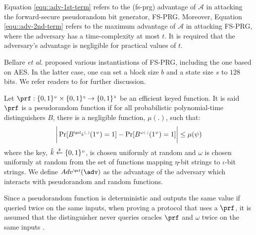 Equation \ref{equ::adv-1st-term}  refers to the (fs-prg) advantage of $\mathcal{A}$ in attacking the forward-secure pseudorandom bit generator, FS-PRG. Moreover, Equation \ref{equ::adv-2nd-term} refers to the maximum advantage of $\mathcal{A}$ in attacking FS-PRG, where the adversary has a time-complexity at most $t$. It is required that the adversary's advantage is negligible for practical values of $t$. 




Bellare \textit{et al.} \cite{BellareY03} proposed various instantiations of FS-PRG, including the one based on AES. In the latter case, one can set a block size $b$ and a state size $s$ to $128$ bits. We refer readers to \cite{BellareY03} for further discussion. 


\begin{definition} Let $\prf:\{0,1\}^{\sss\psi}\times \{0,1\}^{\sss \eta}\rightarrow \{0,1\}^{\sss  \lambda}$ be an efficient  keyed function. It is said $\prf$ is a pseudorandom function if for all probabilistic polynomial-time distinguishers $B$, there is a negligible function, $\mu(.)$, such that:
%
 \vspace{-1mm}
\begin{equation*}
\bigg | \Pr[B^{\sss \prf_{\hat{k}}(.)}(1^{\sss \psi})=1]- \Pr[B^{\sss \omega(.)}(1^{\sss \psi})=1] \bigg |\leq\mu(\psi)
\end{equation*}
%
where  the key, $\hat{k}\stackrel{\scriptscriptstyle\$}\leftarrow\{0,1\}^{\scriptscriptstyle\psi}$, is chosen uniformly at random and $\omega$ is chosen uniformly at random from the set of functions mapping $\eta$-bit strings to $\iota$-bit strings. We define $Adv^{\sss\prf}(\adv)$ as the advantage of the adversary which interacts with pseudorandom and random functions. 

\end{definition}

Since a pseudorandom function is deterministic and outputs the same value if queried twice on the same inputs, when proving a protocol that uses a $\prf$, it is assumed that the distinguisher never queries oracles $\prf$ and $\omega$ twice on the same inputs \cite{KatzLindell2014}. 

